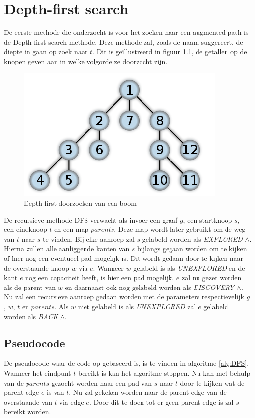 \chapter{Depth-first search}
\label{chap:depthfirst}

De eerste methode die onderzocht is voor het zoeken naar een augmented path is de Depth-first search methode. Deze methode zal, zoals de naam suggereert, de diepte in gaan op zoek naar $t$. Dit is ge\"illustreerd in figuur \ref{fig:depthFirstTree}, de getallen op de knopen geven aan in welke volgorde ze doorzocht zijn.

\begin{figure}[h]
 \centering
 \includegraphics[width=0.5\linewidth]{depthfirst/depthfirsttree}
 \caption{Depth-first doorzoeken van een boom}
 \label{fig:depthFirstTree}
\end{figure}

De recursieve methode DFS verwacht als invoer een graaf $g$, een startknoop $s$, een eindknoop $t$ en een map $parents$. Deze map wordt later gebruikt om de weg van $t$ naar $s$ te vinden. Bij elke aanroep zal $s$ gelabeld worden als \textit{EXPLORED} $\land$. Hierna zullen alle aanliggende kanten van $s$ bijlangs gegaan worden om te kijken of hier nog een eventueel pad mogelijk is. Dit wordt gedaan door te kijken naar de overstaande knoop $w$ via $e$. Wanneer $w$ gelabeld is als \textit{UNEXPLORED} en de kant $e$ nog een capaciteit heeft, is hier een pad mogelijk. $e$ zal nu gezet worden als de parent van $w$ en daarnaast ook nog gelabeld worden als \textit{DISCOVERY} $\land$. Nu zal een recursieve aanroep gedaan worden met de parameters respectievelijk $g$, $w$, $t$ en $parents$.
Als $w$ niet gelabeld is als \textit{UNEXPLORED} zal $e$ gelabeld worden als \textit{BACK} $\land$.

\section{Pseudocode}
De pseudocode waar de code op gebaseerd is, is te vinden in algoritme \ref{alg:DFS}.
Wanneer het eindpunt $t$ bereikt is kan het algoritme stoppen. Nu kan met behulp van de $parents$ gezocht worden naar een pad van $s$ naar $t$ door te kijken wat de parent edge $e$ is van $t$. Nu zal gekeken worden naar de parent edge van de overstaande van $t$ via edge $e$. Door dit te doen tot er geen parent edge is zal $s$ bereikt worden.

